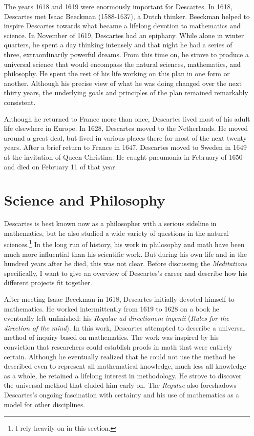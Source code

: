 The years 1618 and 1619 were enormously important for Descartes. In 1618, Descartes met Isaac Beeckman (1588-1637), a Dutch thinker. Beeckman helped to inspire Descartes towards what became a lifelong devotion to mathematics and science. In November of 1619, Descartes had an epiphany. While alone in winter quarters, he spent a day thinking intensely and that night he had a series of three, extraordinarily powerful dreams. From this time on, he strove to produce a universal science that would encompass the natural sciences, mathematics, and philosophy. He spent the rest of his life working on this plan in one form or another. Although his precise view of what he was doing changed over the next thirty years, the underlying goals and principles of the plan remained remarkably consistent.

Although he returned to France more than once, Descartes lived most of his adult life elsewhere in Europe. In 1628, Descartes moved to the Netherlands. He moved around a great deal, but lived in various places there for most of the next twenty years. After a brief return to France in 1647, Descartes moved to Sweden in 1649 at the invitation of Queen Christina. He caught pneumonia in February of 1650 and died on February 11 of that year.

\section*{Science and Philosophy}

Descartes is best known now as a philosopher with a serious sideline in mathematics, but he also studied a wide variety of questions in the natural sciences.\footnote{I rely heavily on \textcite{gaukroger2011} in this section.} In the long run of history, his work in philosophy and math have been much more influential than his scientific work. But during his own life and in the hundred years after he died, this was not clear. Before discussing the \textit{Meditations} specifically, I want to give an overview of Descartes's career and describe how his different projects fit together.

After meeting Isaac Beeckman in 1618, Descartes initially devoted himself to mathematics. He worked intermittently from 1619 to 1628 on a book he eventually left unfinished: his \textit{Regulae ad directionem ingenii} (\textit{Rules for the direction of the mind}). In this work, Descartes attempted to describe a universal method of inquiry based on mathematics. The work was inspired by his conviction that researchers could establish proofs in math that were entirely certain. Although he eventually realized that he could not use the method he described even to represent all mathematical knowledge, much less all knowledge as a whole, he retained a lifelong interest in methodology. He strove to discover the universal method that eluded him early on. The \textit{Regulae} also foreshadows Descartes's ongoing fascination with certainty and his use of mathematics as a model for other disciplines.

